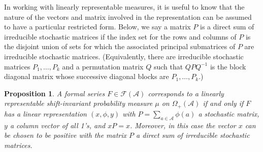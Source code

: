 \documentclass{kepart2010}
\theoremstyle{plain}
\newtheorem{prop}[thm]{Proposition}
\theoremstyle{definition}
\theoremstyle{remark}
\theoremstyle{definition}
\numberwithin{equation}{section}
\begin{document}
 In working with linearly representable measures, it is useful to
know that the nature of the vectors and matrix involved in the
representation can be assumed to have a particular restricted form.
{}{Below, we say a matrix $P$ is a direct sum of irreducible
stochastic matrices if the index set for the rows and columns of $P$
is the disjoint union of sets for which the associated principal
submatrices of $P$ are irreducible stochastic matrices.
(Equivalently, there are irreducible stochastic matrices $P_1, \dots
, P_k$ and a permutation matrix $Q$ such that $QPQ^{-1}$ is the
block diagonal matrix whose successive diagonal blocks are $P_1,
\dots , P_k$.)  }

\begin{prop}\label{prop_redrep}  A formal series
 $F \in \mathcal{F}({{\mathcal A}})$ corresponds to
a linearly representable shift-invariant probability measure $\mu$
on $\Omega_+({{\mathcal A}})$ if and only if $F$ has a linear representation
$(x, \phi, y)$ with  $P=\sum_{a\in {{\mathcal A}}}\phi(a)$ a stochastic matrix,
$y$ a column vector of all 1's, and $xP=x$. Moreover, in this case
the vector $x$ can be chosen to be positive with the matrix $P$ a
direct sum of irreducible stochastic matrices.
\end{prop}
\end{document}
